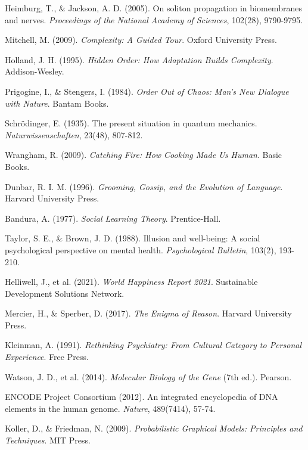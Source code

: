 \documentclass[12pt,a4paper]{article}
\begin{document}
\begin{thebibliography}{99}
Heimburg, T., \& Jackson, A. D. (2005). On soliton propagation in biomembranes and nerves. \textit{Proceedings of the National Academy of Sciences}, 102(28), 9790-9795.

Mitchell, M. (2009). \textit{Complexity: A Guided Tour}. Oxford University Press.

Holland, J. H. (1995). \textit{Hidden Order: How Adaptation Builds Complexity}. Addison-Wesley.

Prigogine, I., \& Stengers, I. (1984). \textit{Order Out of Chaos: Man's New Dialogue with Nature}. Bantam Books.

Schrödinger, E. (1935). The present situation in quantum mechanics. \textit{Naturwissenschaften}, 23(48), 807-812.

Wrangham, R. (2009). \textit{Catching Fire: How Cooking Made Us Human}. Basic Books.

Dunbar, R. I. M. (1996). \textit{Grooming, Gossip, and the Evolution of Language}. Harvard University Press.

Bandura, A. (1977). \textit{Social Learning Theory}. Prentice-Hall.

Taylor, S. E., \& Brown, J. D. (1988). Illusion and well-being: A social psychological perspective on mental health. \textit{Psychological Bulletin}, 103(2), 193-210.

Helliwell, J., et al. (2021). \textit{World Happiness Report 2021}. Sustainable Development Solutions Network.

Mercier, H., \& Sperber, D. (2017). \textit{The Enigma of Reason}. Harvard University Press.

Kleinman, A. (1991). \textit{Rethinking Psychiatry: From Cultural Category to Personal Experience}. Free Press.

Watson, J. D., et al. (2014). \textit{Molecular Biology of the Gene} (7th ed.). Pearson.

ENCODE Project Consortium (2012). An integrated encyclopedia of DNA elements in the human genome. \textit{Nature}, 489(7414), 57-74.

Koller, D., \& Friedman, N. (2009). \textit{Probabilistic Graphical Models: Principles and Techniques}. MIT Press.


\end{thebibliography}
\end{document}
